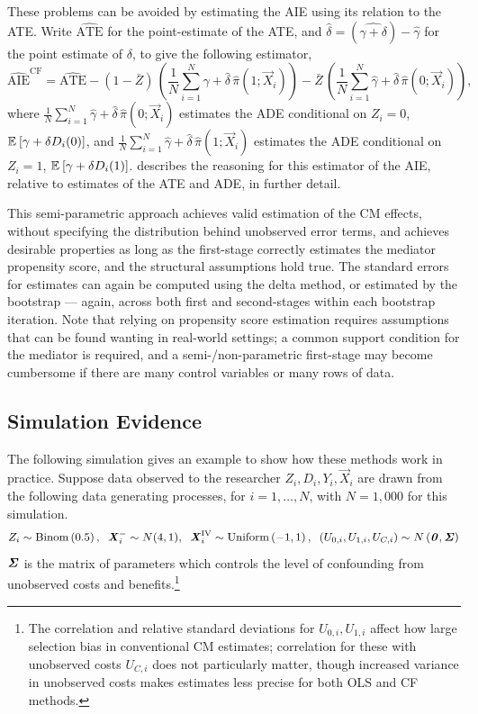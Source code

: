 These problems can be avoided by estimating the AIE using its relation to the ATE.
Write $\hat{\text{ATE}}$ for the point-estimate of the ATE, and 
$\hat\delta = (\hat{\gamma + \delta}) - \hat\gamma$ for the point estimate of $\delta$, to give the following estimator,
\[ \hat{\text{AIE}}^{\text{CF}}
    = \hat{\text{ATE}}
    - (1 - \bar Z) \, \left( 
        \frac 1N \sum_{i = 1}^N \hat\gamma + \hat \delta \, \hat\pi(1; \vec X_i) \right)
    - \bar Z \, \left(
        \frac 1N \sum_{i = 1}^N \hat\gamma + \hat \delta \, \hat\pi(0; \vec X_i)  \right), \]
where $\frac 1N \sum_{i = 1}^N \hat\gamma + \hat \delta \, \hat\pi(0; \vec X_i)$ estimates the ADE conditional on $Z_i = 0$, $\mathbb{E}_{} \left[ \gamma + \delta D_i(0) \right]$, and $\frac 1N \sum_{i = 1}^N \hat\gamma + \hat \delta \, \hat\pi(1; \vec X_i)$ estimates the ADE conditional on $Z_i = 1$, $\mathbb{E}_{} \left[ \gamma + \delta D_i(1) \right]$.
 describes the reasoning for this estimator of the AIE, relative to estimates of the ATE and ADE, in further detail.

This semi-parametric approach achieves valid estimation of the CM effects, without specifying the distribution behind unobserved error terms, and achieves desirable properties as long as the first-stage correctly estimates the mediator propensity score, and the structural assumptions hold true.
The standard errors for estimates can again be computed using the delta method, or estimated by the bootstrap --- again, across both first and second-stages within each bootstrap iteration.
Note that relying on propensity score estimation requires assumptions that can be found wanting in real-world settings; a common support condition for the mediator is required, and a semi-/non-parametric first-stage may become cumbersome if there are many control variables or many rows of data.

\subsection{Simulation Evidence}
\label{sec:simulations}
The following simulation gives an example to show how these methods work in practice.
Suppose data observed to the researcher $Z_i, D_i, Y_i, \vec X_i$ are drawn from the following data generating processes, for $i = 1, \hdots, N$, with 
$N = 1,000$ for this simulation.
\[ Z_i \sim \text{Binom}\left(0.5 \right),
    \;\; \boldsymbol{\mathit{X}}_i^- \sim N(4, 1),
    \;\; \boldsymbol{\mathit{X}}_i^{\text{IV}} \sim \text{Uniform}\left( -1, 1 \right),
    \;\; \left( U_{0,i}, U_{1,i}, U_{C,i} \right) \sim
    N\left( \boldsymbol{\mathit{0}}, \boldsymbol{\mathit{\Sigma}} \right) \]
$\boldsymbol{\mathit{\Sigma}}$ is the matrix of parameters which controls the level of confounding from unobserved costs and benefits.\footnote{
    The correlation and relative standard deviations for $U_{0,i}, U_{1,i}$ affect how large selection bias in conventional CM estimates; correlation for these with unobserved costs $U_{C,i}$ does not particularly matter, though increased variance in unobserved costs makes estimates less precise for both OLS and CF methods.
}

